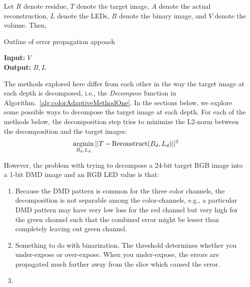 Let $R$ denote residue, $T$ denote the target image, $A$ denote the actual reconstruction, $L$ denote the LEDs, $B$ denote the binary image, and $V$ denote the volume. Then, 

\begin{algorithm}
    \caption{Outline of error propagation appoach}
    \label{alg:colorAdaptiveMethodOne}
    \hspace*{\algorithmicindent}\textbf{Input:} $V$\\
    \hspace*{\algorithmicindent}\textbf{Output:} $B, L$
    \begin{algorithmic}[1]
        \ENDFOR
    \end{algorithmic}
\end{algorithm}

The methods explored here differ from each other in the way the target image at each depth is decomposed, i.e., the \emph{Decompose} function in Algorithm.~\ref{alg:colorAdaptiveMethodOne}.
In the sections below, we explore some possible ways to decompose the target image at each depth.
For each of the methods below, the decomposition step tries to minimize the L2-norm between the decomposition and the target images:
\begin{equation}
    \operatorname*{arg\!\min}_{B_d,L_d} ||T - \text{Reconstruct}(B_d, L_d) ||^2
\end{equation}

However, the problem with trying to decompose a 24-bit target RGB image into a 1-bit DMD image and an RGB LED value is that:
\begin{enumerate}
    \item Because the DMD pattern is common for the three color channels, the decomposition is not separable among the color-channels, e.g., a particular DMD pattern may have very low loss for the red channel but very high for the green channel such that the combined error might be lesser than completely leaving out green channel. 
    \item Something to do with binarization. The threshold determines whether you under-expose or over-expose. When you under-expose, the errors are propagated much farther away from the slice which caused the error.
    \item 
\end{enumerate}

